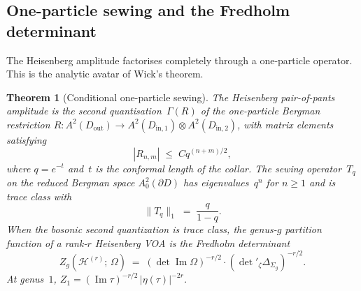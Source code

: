 \documentclass[11pt,reqno]{amsart}
\newtheorem{theorem}{Theorem}[section]
\theoremstyle{definition}
\theoremstyle{remark}
\newcommand{\cH}{\mathcal{H}}
\newcommand{\GG}{\Gamma}
\numberwithin{equation}{section}
\begin{document}
\subsection{One-particle sewing and the Fredholm
 determinant}\label{subsec:one-particle}

The Heisenberg amplitude factorises completely through a
one-particle operator.  This is the analytic avatar of
Wick's theorem.

\begin{theorem}[Conditional one-particle sewing]
\label{thm:heisenberg-one-particle}
The Heisenberg pair-of-pants amplitude is the second
quantisation~$\GG(R)$ of the one-particle Bergman restriction
$R \colon A^2(D_{\mathrm{out}}) \to
A^2(D_{\mathrm{in},1}) \otimes A^2(D_{\mathrm{in},2})$,
with matrix elements satisfying
\[
|R_{n,m}| \;\leq\; C q^{(n+m)/2},
\]
where $q = e^{-t}$ and~$t$ is the conformal length of the
collar.  The sewing operator~$T_q$ on the reduced Bergman space
$A^2_0(\partial D)$ has eigenvalues~$q^n$ for $n \geq 1$
and is trace class with
\begin{equation}\label{eq:sewing-trace-norm}
\|T_q\|_1 \;=\; \frac{q}{1 - q}.
\end{equation}
When the bosonic second quantization is trace class, the genus-$g$
partition function of a rank-$r$ Heisenberg VOA is the Fredholm
determinant
\begin{equation}\label{eq:heisenberg-fredholm}
Z_g(\cH^{(r)};\,\Omega)
\;=\;
(\det\operatorname{Im}\Omega)^{-r/2}
\cdot (\det{}'_\zeta \Delta_{\Sigma_g})^{-r/2}.
\end{equation}
At genus~$1$,
$Z_1 = (\operatorname{Im}\tau)^{-r/2}\,
|\eta(\tau)|^{-2r}$.
\end{theorem}
\end{document}
